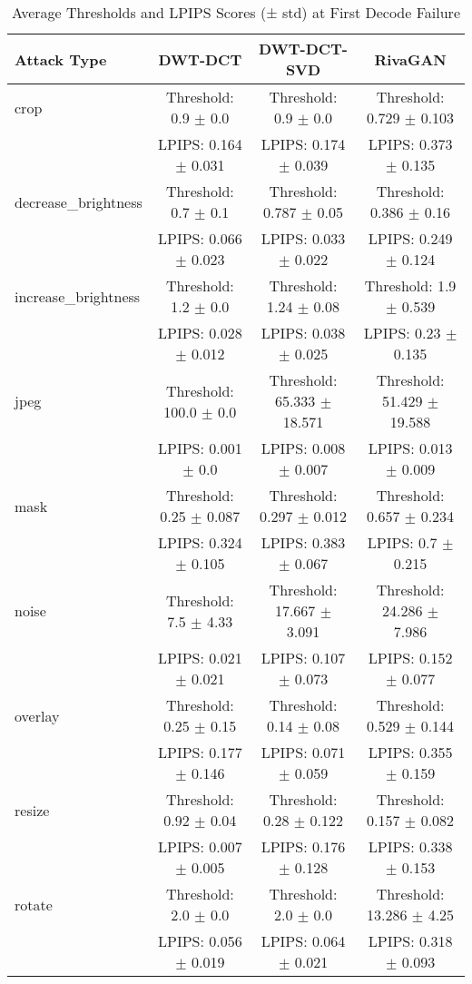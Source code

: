 \begin{table}[ht]
\centering
\caption{Average Thresholds and LPIPS Scores (± std) at First Decode Failure}
\label{tab:avg_threshold_lpips}
\renewcommand{\arraystretch}{1.2}
\begin{tabular}{|l|c|c|c|}
\hline
\textbf{Attack Type} & \textbf{DWT-DCT} & \textbf{DWT-DCT-SVD} & \textbf{RivaGAN} \\
\hline
crop & Threshold: 0.9 $\pm$ 0.0 & Threshold: 0.9 $\pm$ 0.0 & Threshold: 0.729 $\pm$ 0.103 \\
 & LPIPS: 0.164 $\pm$ 0.031 & LPIPS: 0.174 $\pm$ 0.039 & LPIPS: 0.373 $\pm$ 0.135 \\
\hline
decrease_brightness & Threshold: 0.7 $\pm$ 0.1 & Threshold: 0.787 $\pm$ 0.05 & Threshold: 0.386 $\pm$ 0.16 \\
 & LPIPS: 0.066 $\pm$ 0.023 & LPIPS: 0.033 $\pm$ 0.022 & LPIPS: 0.249 $\pm$ 0.124 \\
\hline
increase_brightness & Threshold: 1.2 $\pm$ 0.0 & Threshold: 1.24 $\pm$ 0.08 & Threshold: 1.9 $\pm$ 0.539 \\
 & LPIPS: 0.028 $\pm$ 0.012 & LPIPS: 0.038 $\pm$ 0.025 & LPIPS: 0.23 $\pm$ 0.135 \\
\hline
jpeg & Threshold: 100.0 $\pm$ 0.0 & Threshold: 65.333 $\pm$ 18.571 & Threshold: 51.429 $\pm$ 19.588 \\
 & LPIPS: 0.001 $\pm$ 0.0 & LPIPS: 0.008 $\pm$ 0.007 & LPIPS: 0.013 $\pm$ 0.009 \\
\hline
mask & Threshold: 0.25 $\pm$ 0.087 & Threshold: 0.297 $\pm$ 0.012 & Threshold: 0.657 $\pm$ 0.234 \\
 & LPIPS: 0.324 $\pm$ 0.105 & LPIPS: 0.383 $\pm$ 0.067 & LPIPS: 0.7 $\pm$ 0.215 \\
\hline
noise & Threshold: 7.5 $\pm$ 4.33 & Threshold: 17.667 $\pm$ 3.091 & Threshold: 24.286 $\pm$ 7.986 \\
 & LPIPS: 0.021 $\pm$ 0.021 & LPIPS: 0.107 $\pm$ 0.073 & LPIPS: 0.152 $\pm$ 0.077 \\
\hline
overlay & Threshold: 0.25 $\pm$ 0.15 & Threshold: 0.14 $\pm$ 0.08 & Threshold: 0.529 $\pm$ 0.144 \\
 & LPIPS: 0.177 $\pm$ 0.146 & LPIPS: 0.071 $\pm$ 0.059 & LPIPS: 0.355 $\pm$ 0.159 \\
\hline
resize & Threshold: 0.92 $\pm$ 0.04 & Threshold: 0.28 $\pm$ 0.122 & Threshold: 0.157 $\pm$ 0.082 \\
 & LPIPS: 0.007 $\pm$ 0.005 & LPIPS: 0.176 $\pm$ 0.128 & LPIPS: 0.338 $\pm$ 0.153 \\
\hline
rotate & Threshold: 2.0 $\pm$ 0.0 & Threshold: 2.0 $\pm$ 0.0 & Threshold: 13.286 $\pm$ 4.25 \\
 & LPIPS: 0.056 $\pm$ 0.019 & LPIPS: 0.064 $\pm$ 0.021 & LPIPS: 0.318 $\pm$ 0.093 \\
\hline
\end{tabular}
\end{table}